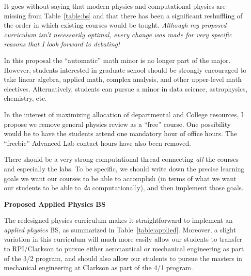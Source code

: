 \documentclass[12pt,preprint]{aastex}
\begin{document}
\vspace{-2mm}
\begin{itemize*}
\item{It goes without saying that modern physics and computational physics are
  missing from Table~\ref{table:bs} and that there has been a significant
  reshuffling of the order in which existing courses would be taught.  {\em
    Although my proposed curriculum isn't necessarily optimal, every change was
    made for very specific reasons that I look forward to debating!}}
\item{In this proposal the ``automatic'' math minor is no longer part of the
  major.  However, students interested in graduate school should be strongly
  encouraged to take linear algebra, applied math, complex analysis, and other
  upper-level math electives.  Alternatively, students can pursue a minor in
  data science, astrophysics, chemistry, etc.}
\item{In the interest of maximizing allocation of departmental and College
  resources, I propose we remove general physics review as a ``free'' course.
  One possibility would be to have the students attend one mandatory hour of
  office hours.  The ``freebie'' Advanced Lab contact hours have also been
  removed.} 
\item{There should be a very strong computational thread connecting \emph{all}
  the courses---and especially the labs.  To be specific, we should write down
  the precise learning goals we want our courses to be able to accomplish (in
  terms of what we want our students to be able to \emph{do} computationally),
  and then implement those goals.} 
\end{itemize*}

\vspace{2mm}
{\large \sc \textbf{Proposed Applied Physics BS}}

The redesigned physics curriculum makes it straightforward to implement an {\em
  applied physics} BS, as summarized in Table~\ref{table:applied}.  Moreover, a
slight variation in this curriculum will much more easily allow our students to
transfer to RPI/Clarkson to pursue either aeronautical or mechanical engineering
as part of the 3/2 program, and should also allow our students to pursue the
masters in mechanical engineering at Clarkson as part of the 4/1 program.
\end{document}
